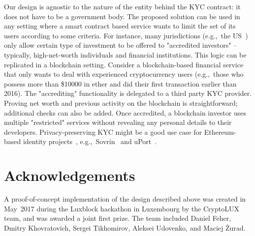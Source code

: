 Our design is agnostic to the nature of the entity behind the KYC contract: it does not have to be a government body.
The proposed solution can be used in any setting where a smart contract based service wants to limit the set of its users according to some criteria.
For instance, many jurisdictions (e.g.,~the US~\cite{SEC}) only allow certain type of investment to be offered to "accredited investors" -- typically, high-net-worth individuals and financial institutions.
This logic can be replicated in a blockchain setting.
Consider a blockchain-based financial service that only wants to deal with experienced cryptocurrency users (e.g.,~those who possess more than \$10000 in ether and did their first transaction earlier than 2016).
The "accrediting" functionality is delegated to a third party KYC provider.
Proving net worth and previous activity on the blockchain is straightforward; additional checks can also be added.
Once accredited, a blockchain investor uses multiple "restricted" services without revealing any personal details to their developers.
Privacy-preserving KYC might be a good use case for Ethereum-based identity projects~\cite{Mesropyan2017}, e.g.,~Sovrin~\cite{Sovrin} and uPort~\cite{Uport}.




\section{Acknowledgements}

A proof-of-concept implementation of the design described above was created in May~2017 during the Luxblock hackathon in Luxembourg by the CryptoLUX team, and was awarded a joint first prize.
The team included Daniel Feher, Dmitry Khovratovich, Sergei Tikhomirov, Aleksei Udovenko, and Maciej \.{Z}urad.

